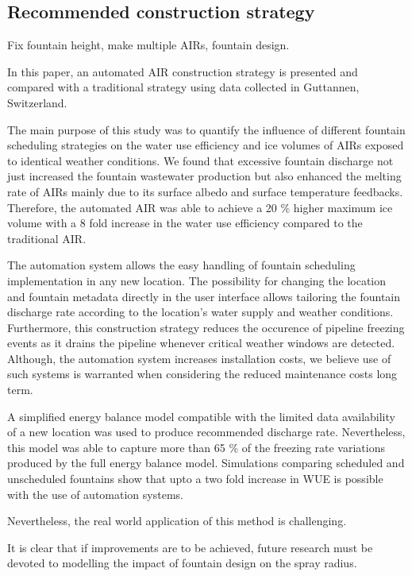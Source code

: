 \documentclass[tc, manuscript]{copernicus}
\begin{document}
\subsection{Recommended construction strategy}
Fix fountain height, make multiple AIRs, fountain design.

\conclusions

In this paper, an automated AIR construction strategy is presented and compared with a traditional strategy
using data collected in Guttannen, Switzerland.

The main purpose of this study was to quantify the influence of different fountain scheduling strategies on the
water use efficiency and ice volumes of AIRs exposed to identical weather conditions. We found that excessive
fountain discharge not just increased the fountain wastewater production but also enhanced the melting rate of
AIRs mainly due to its surface albedo and surface temperature feedbacks. Therefore, the automated AIR was able
to achieve a 20 \% higher maximum ice volume with a 8 fold increase in the water use efficiency compared to the
traditional AIR.

The automation system allows the easy handling of fountain scheduling implementation in any new location. The
possibility for changing the location and fountain metadata directly in the user interface allows tailoring the
fountain discharge rate according to the location's water supply and weather conditions. Furthermore, this
construction strategy reduces the occurence of pipeline freezing events as it drains the pipeline whenever
critical weather windows are detected. Although, the automation system increases installation costs, we believe
use of such systems is warranted when considering the reduced maintenance costs long term.

A simplified energy balance model compatible with the limited data availability of a new location was used to
produce recommended discharge rate. Nevertheless, this model was able to capture more than 65 \% of the freezing
rate variations produced by the full energy balance model. Simulations comparing scheduled and unscheduled
fountains show that upto a two fold increase in WUE is possible with the use of automation systems.

Nevertheless, the real world application of this method is challenging. 

It is clear that if improvements are to be achieved, future research must be devoted to modelling the impact of
fountain design on the spray radius.
\end{document}

